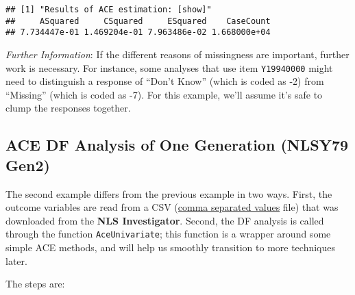 \documentclass[smallextended]{svjour3}       %
\begin{document}
\begin{verbatim}
## [1] "Results of ACE estimation: [show]"
##     ASquared     CSquared     ESquared    CaseCount 
## 7.734447e-01 1.469204e-01 7.963486e-02 1.668000e+04
\end{verbatim}

\emph{Further Information}: If the different reasons of missingness are
important, further work is necessary. For instance, some analyses that
use item \texttt{Y19940000} might need to distinguish a response of
``Don't Know'' (which is coded as -2) from ``Missing'' (which is coded
as -7). For this example, we'll assume it's safe to clump the responses
together.

\hypertarget{ace-df-analysis-of-one-generation-nlsy79-gen2}{%
\subsection{ACE DF Analysis of One Generation (NLSY79
Gen2)}\label{ace-df-analysis-of-one-generation-nlsy79-gen2}}

The second example differs from the previous example in two ways. First,
the outcome variables are read from a CSV
(\href{https://en.wikipedia.org/wiki/Comma-separated_values}{comma
separated values} file) that was downloaded from the \textbf{NLS
Investigator}. Second, the DF analysis is called through the function
\texttt{AceUnivariate}; this function is a wrapper around some simple
ACE methods, and will help us smoothly transition to more techniques
later.

The steps are:
\end{document}
